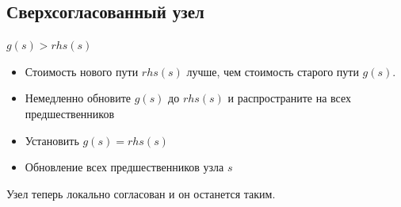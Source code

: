 \documentclass[12pt]{article}
\begin{document}
\subsection*{Сверхсогласованный узел}
\begin{center}
          $g(s)>rhs(s)$
\end{center}
\begin{itemize}
    \item Стоимость нового пути $rhs(s)$ лучше, чем стоимость старого пути $g(s)$.
    \item Немедленно обновите $g(s)$ до $rhs(s)$ и распространите на всех предшественников
    \item Установить $g(s) = rhs(s)$
    \item Обновление всех предшественников узла $s$
\end{itemize}
Узел теперь локально согласован и он останется таким.
\end{document}
